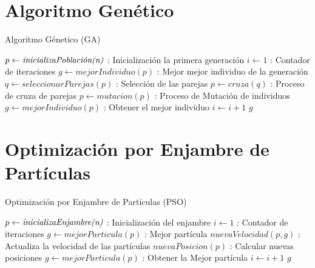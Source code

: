 \documentclass[10pt,letterpaper,twoside,openright]{article}
\begin{document}
	\section{Algoritmo Genético}
	
		\begin{algorithm}[H]
			\caption{Algoritmo Génetico (GA)}
				$ p \leftarrow \emph{inicializaPoblación(n)}$ : Inicialización la primera generación\;
				$ i \leftarrow 1 $ : Contador de iteraciones\;
				$ g \leftarrow mejorIndividuo(p) $ : Mejor mejor individuo de la generación\;
				{
					$q \leftarrow seleccionarParejas(p) $ : Selección de las parejas\;
					$ p \leftarrow cruza(q) $ : Proceso de cruza de parejas\;
					$ p \leftarrow mutacion(p) $ : Proceso de Mutación de individuos\;
					$ g \leftarrow mejorIndividuo(p) $ : Obtener el mejor individuo\;
					$ i \leftarrow  i + 1 $\;
				}
		 		\Return $ g $
		 \end{algorithm}
	
	\section{Optimización por Enjambre de Partículas}
	
		\begin{algorithm}[H]
			\caption{Optimización por Enjambre de Partículas (PSO)}
				$ p \leftarrow \emph{inicializaEnjambre(n)}$ : Inicialización del enjambre\;
				$ i \leftarrow 1 $ : Contador de iteraciones\;
				$ g \leftarrow mejorParticula(p) $ : Mejor partícula\;
				{
					$ nuevaVelocidad(p,g) $ : Actualiza la velocidad de las partículas\;
					$ nuevaPosicion(p) $ : Calcular nuevas posiciones\;
					$ g \leftarrow mejorParticula(p) $ : Obtener la Mejor partícula\;
					$ i \leftarrow  i + 1 $\;
				}
		 		\Return $ g $
		 \end{algorithm}
\end{document}
